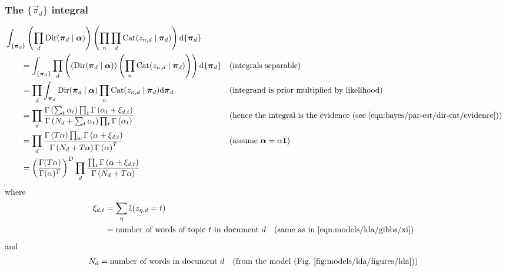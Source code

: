 \subsubsection{The $\{\vec \pi_d\}$ integral}
\label{sec:models/lda/collapsed-gibbs/pi-integral}
\begin{align}
    \hspace{2em}&\hspace{-2em}
    \int_{\{\vec \pi_d\}}
        \left(
            \prod_d \Dir(\vec \pi_d \given \vec \alpha)
        \right)
        \left(
            \prod_n \prod_d \Cat(z_{n, d} \given \vec \pi_d)
        \right)
    \mathrm d\{\vec \pi_d\} \nonumber\\
    &= \int_{\{\vec \pi_d\}}
        \prod_d \left(
            \left(
                \Dir(\vec \pi_d \given \vec \alpha)
            \right)
            \left(
                \prod_n \Cat(z_{n, d} \given \vec \pi_d)
            \right)
        \right)
    \mathrm d\{\vec \pi_d\} &&\text{(integrals separable)}\nonumber\\
    &= \prod_d
        \int_{\vec \pi_d}
            \Dir(\vec \pi_d \given \vec \alpha)
            \prod_n \Cat(z_{n, d} \given \vec \pi_d)
        \mathrm d\vec \pi_d && \text{(integrand is prior multiplied by likelihood)}\nonumber\\
    &= \prod_d
        \frac
        {
            \Gamma\left(\sum_t \alpha_t\right) \prod_t \Gamma\left(\alpha_t + \xi_{d, t}\right)
        }
        {
            \Gamma\left(N_d + \sum_t \alpha_t\right) \prod_t \Gamma\left(\alpha_t\right)
        } && \text{(hence the integral is the evidence (see \eqref{eqn:bayes/par-est/dir-cat/evidence}))} \nonumber\\
    &= \prod_d
        \frac
        {
            \Gamma\left(T\alpha\right) \prod_w \Gamma\left(\alpha + \xi_{d, t}\right)
        }
        {
            \Gamma\left(N_d + T \alpha\right) \Gamma\left(\alpha\right)^T
        } && \text{(assume $\vec \alpha = \alpha \vec 1$)} \nonumber\\
    &=
        \left(
            \frac
            {
                \Gamma(T \alpha)
            }
            {
                \Gamma(\alpha)^T
            }
        \right)^D
        \prod_d
            \frac
            {
                \prod_t \Gamma\left(\alpha + \xi_{d, t}\right)
            }
            {
                \Gamma\left(N_d + T \alpha\right)
            }
\end{align}
where
\begin{align}
    \xi_{d, t}       &= \sum_\eta \operatorname{\mathbb I}(z_{\eta, d} = t) \\
                    &= \text{number of words of topic $t$ in document $d$} && \text{(same as in \eqref{eqn:models/lda/gibbs/xi})}\nonumber
\end{align}
and
\begin{align}
    N_d     &= \text{number of words in document $d$} && \text{(from the model (Fig.~\ref{fig:models/lda/figures/lda}))}
\end{align}